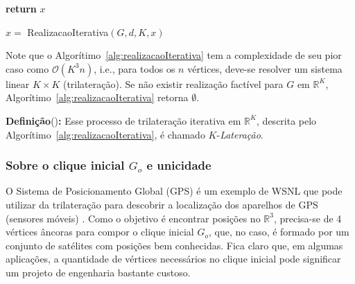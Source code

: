\begin{algorithm}[H]
	\label{alg:realizacaoIterativa}
	\textbf{return} $x$\;
	\caption{$x =$ RealizacaoIterativa$(G,d, K, x)$ \cite{libertiEDG}}
\end{algorithm}
\vspace{0.5cm}
Note que o Algorítimo~\ref{alg:realizacaoIterativa} tem a complexidade de seu pior caso como $\mathcal{O}(K^3n)$, i.e., para todos os $n$ vértices, deve-se resolver um sistema linear $K\times K$ (trilateração). Se não existir realização factível para $G$ em $\mathbb{R}^K$, Algorítimo~\ref{alg:realizacaoIterativa} retorna $\emptyset$.

\begin{center}
	\begin{minipage}{0.93 \linewidth}
		\textbf{Definição}(\cite{eren2004rigidity})\textbf{:} Esse processo de trilateração iterativa em $\mathbb{R}^K$, descrita pelo Algorítimo~\ref{alg:realizacaoIterativa}, é chamado $K$-\textit{Lateração}.
	\end{minipage}
\end{center}

\subsubsection{Sobre o clique inicial $G_o$ e unicidade \label{sec:go}}
O Sistema de Posicionamento Global (GPS) é um exemplo de WSNL que pode utilizar da trilateração para descobrir a localização dos aparelhos de GPS (sensores móveis) \cite{gps}. Como o objetivo é encontrar posições no $\mathbb{R}^3$, precisa-se de 4 vértices âncoras para compor o clique inicial $G_o$, que, no caso, é formado por um conjunto de satélites com posições bem conhecidas. Fica claro que, em algumas aplicações, a quantidade de vértices necessários no clique inicial pode significar um projeto de engenharia bastante custoso.

